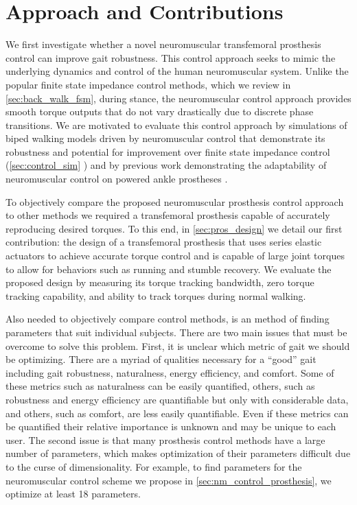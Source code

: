 \section{Approach and Contributions}\label{sec:intro_approach_contrib} 

We first investigate whether a novel neuromuscular transfemoral prosthesis
control can improve gait robustness. This control approach seeks to mimic the
underlying dynamics and control of the human neuromuscular system. Unlike the
popular finite state impedance control methods, which we review in
\cref{sec:back_walk_fsm}, during stance, the neuromuscular control approach
provides smooth torque outputs that do not vary drastically due to discrete
phase transitions.  We are motivated to evaluate this control approach by
simulations of biped walking models driven by neuromuscular control that
demonstrate its robustness \citep{song2013integration,song2015neural} and
potential for improvement over finite state impedance control
(\cref{sec:control_sim} \citep{thatte2016toward}) and by previous work
demonstrating the adaptability of neuromuscular control on powered ankle
prostheses \citep{eilenberg2010control,markowitz2011speed}.

To objectively compare the proposed neuromuscular prosthesis control approach to
other methods we required a transfemoral prosthesis capable of accurately
reproducing desired torques. To this end, in \cref{sec:pros_design} we detail
our first contribution: the design of a transfemoral prosthesis that uses series
elastic actuators to achieve accurate torque control and is capable of large
joint torques to allow for behaviors such as running and stumble recovery.  We
evaluate the proposed design by measuring its torque tracking bandwidth, zero
torque tracking capability, and ability to track torques during normal walking.

Also needed to objectively compare control methods, is an method of finding
parameters that suit individual subjects. There are two main issues that must be
overcome to solve this problem. First, it is unclear which metric of gait we
should be optimizing. There are a myriad of qualities necessary for a ``good''
gait including gait robustness, naturalness, energy efficiency, and comfort.
Some of these metrics such as naturalness can be easily quantified, others, such
as robustness and energy efficiency are quantifiable but only with considerable
data, and others, such as comfort, are less easily quantifiable. Even if these
metrics can be quantified their relative importance is unknown and may be unique
to each user. The second issue is that many prosthesis control methods have a
large number of parameters, which makes optimization of their parameters
difficult due to the curse of dimensionality. For example, to find parameters
for the neuromuscular control scheme we propose in 
\cref{sec:nm_control_prosthesis}, we optimize at least 18 parameters.

